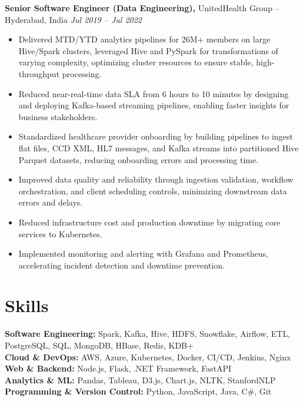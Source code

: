 \documentclass[10pt]{article}
\begin{document}
\textbf{Senior Software Engineer (Data Engineering),} UnitedHealth Group -- Hyderabad, India \hfill \textit{Jul 2019 -- Jul 2022} \\
\vspace{0pt}
\begin{itemize}
  \item Delivered MTD/YTD analytics pipelines for 26M+ members on large Hive/Spark clusters, leveraged Hive and PySpark for transformations of varying complexity, optimizing cluster resources to ensure stable, high-throughput processing.
  \item Reduced near-real-time data SLA from 6 hours to 10 minutes by designing and deploying Kafka-based streaming pipelines, enabling faster insights for business stakeholders.
  \item Standardized healthcare provider onboarding by building pipelines to ingest flat files, CCD XML, HL7 messages, and Kafka streams into partitioned Hive Parquet datasets, reducing onboarding errors and processing time.
  \item Improved data quality and reliability through ingestion validation, workflow orchestration, and client scheduling controls, minimizing downstream data errors and delays.
  \item Reduced infrastructure cost and production downtime by migrating core services to Kubernetes.
  \item Implemented monitoring and alerting with Grafana and Prometheus, accelerating incident detection and downtime prevention.
\end{itemize}

\vspace{0pt}

\section*{Skills}
\textbf{Software Engineering:} Spark, Kafka, Hive, HDFS, Snowflake, Airflow, ETL, PostgreSQL, SQL, MongoDB, HBase, Redis, KDB+ \\
\textbf{Cloud \& DevOps:} AWS, Azure, Kubernetes, Docker, CI/CD, Jenkins, Nginx \\
\textbf{Web \& Backend:} Node.js, Flask, .NET Framework, FastAPI \\
\textbf{Analytics \& ML:} Pandas, Tableau, D3.js, Chart.js, NLTK, StanfordNLP \\
\textbf{Programming \& Version Control:} Python, JavaScript, Java, C\#, Git

\vspace{0pt}
\end{document}
